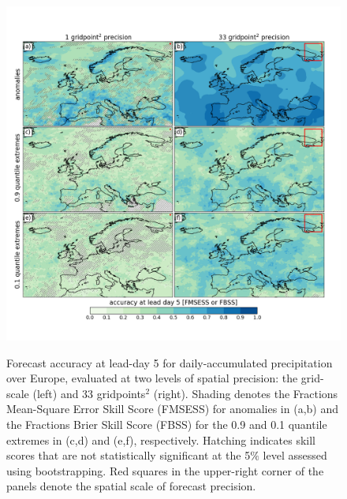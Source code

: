 \documentclass[preprint,12pt,authoryear]{elsarticle}
\begin{document}
\newpage
\begin{figure}[t]
  \noindent\includegraphics[scale=0.45]{fig_02.png}\\
  \caption{Forecast accuracy at lead-day 5 for daily-accumulated precipitation over Europe, evaluated at two levels of spatial precision: the grid-scale (left) and 33 gridpoints$^{2}$ (right). Shading denotes the Fractions Mean-Square Error Skill Score (FMSESS) for anomalies in (a,b) and the Fractions Brier Skill Score (FBSS) for the 0.9 and 0.1 quantile extremes in (c,d) and (e,f), respectively. Hatching indicates skill scores that are not statistically significant at the 5$\%$ level assessed using bootstrapping. Red squares in the upper-right corner of the panels denote the spatial scale of forecast precision.}\label{f2}
\end{figure}
\end{document}
